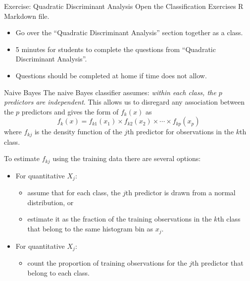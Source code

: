 \documentclass[
  ignorenonframetext,
  aspectratio=169,
]{beamer}
\providecommand{\tightlist}{%
  \setlength{\itemsep}{0pt}\setlength{\parskip}{0pt}}\usepackage{longtable,booktabs,array}
\begin{document}
\begin{frame}{Exercise: Quadratic Discriminant Analysis}
\protect\hypertarget{exercise-quadratic-discriminant-analysis}{}
Open the Classification Exercises R Markdown file.

\begin{itemize}
\item
  Go over the ``Quadratic Discriminant Analysis'' section together as a
  class.
\item
  5 minutes for students to complete the questions from ``Quadratic
  Discriminant Analysis''.
\item
  Questions should be completed at home if time does not allow.
\end{itemize}
\end{frame}

\begin{frame}{Naive Bayes}
\protect\hypertarget{naive-bayes}{}
The naive Bayes classifier assumes:
\textit{within each class, the $p$ predictors are independent}. This
allows us to disregard any association between the \(p\) predictors and
gives the form of \(f_k(x)\) as \[
f_{k}(x)=f_{k 1}\left(x_{1}\right) \times f_{k 2}\left(x_{2}\right) \times \cdots \times f_{k p}\left(x_{p}\right)
\] where \(f_{k j}\) is the density function of the \(j\)th predictor
for observations in the \(k\)th class.

To estimate \(f_{k j}\) using the training data there are several
options:

\begin{itemize}
\item
  For quantitative \(X_j\):

  \begin{itemize}
  \item
    assume that for each class, the \(j\)th predictor is drawn from a
    normal distribution, or
  \item
    estimate it as the fraction of the training observations in the
    \(k\)th class that belong to the same histogram bin as \(x_j\).
  \end{itemize}
\item
  For quantitative \(X_j\):

  \begin{itemize}
  \tightlist
  \item
    count the proportion of training observations for the \(j\)th
    predictor that belong to each class.
  \end{itemize}
\end{itemize}
\end{frame}
\end{document}
